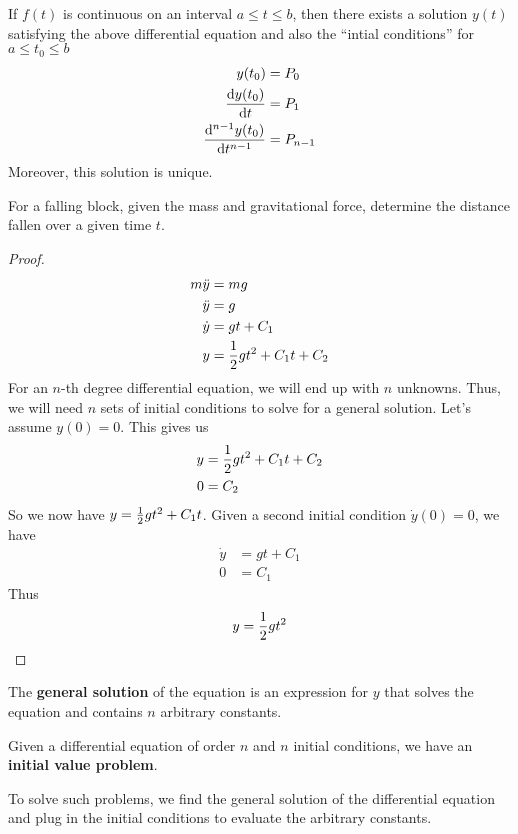 \documentclass[12pt]{article}
\begin{document}
\begin{definition}
If $f(t)$ is continuous on an interval $a \leq t \leq b$, then there exists a solution $y(t)$ satisfying the above differential equation and also the ``intial conditions'' for $a \leq t_0 \leq b$
\begin{align*}
y(t_0) &= P_0\\
\frac{{\rm d} y(t_0)}{{\rm d} t} &= P_1\\
\frac{{\rm d}^{n-1} y(t_0)}{{\rm d} t^{n-1}} &= P_{n-1}
\end{align*}
Moreover, this solution is unique.
\end{definition}

\begin{example}
For a falling block, given the mass and gravitational force, determine the distance fallen over a given time $t$.
\end{example}

\begin{proof}
\begin{align*}
m \ddot y &= mg\\
\ddot y &= g\\
\dot y &= gt + C_1\\
y &= \frac{1}{2} gt^2 + C_1t + C_2
\end{align*}
For an $n$-th degree differential equation, we will end up with $n$ unknowns. Thus, we will need $n$ sets of initial conditions to solve for a general solution. Let's assume $y(0) = 0$. This gives us
\begin{align*}
y &= \frac{1}{2} gt^2 + C_1t + C_2\\
0 &= C_2\\
\end{align*}
So we now have $y = \frac{1}{2} gt^2 + C_1t$. Given a second initial condition $\dot y(0) = 0$, we have
\begin{align*}
\dot y &= gt + C_1\\
0 &= C_1
\end{align*}
Thus \[ y = \frac{1}{2} gt^2 \]
\end{proof}

The {\bf general solution} of the equation is an expression for $y$ that solves the equation and contains $n$ arbitrary constants.

Given a differential equation of order $n$ and $n$ initial conditions, we have an {\bf initial value problem}.

To solve such problems, we find the general solution of the differential equation and plug in the initial conditions to evaluate the arbitrary constants.
\end{document}
